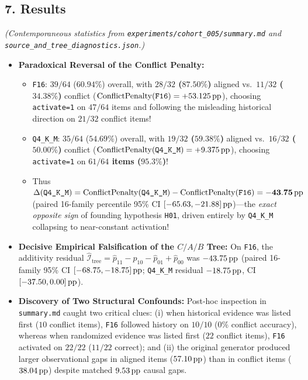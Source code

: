 \subsection*{7. Results}
\emph{(Contemporaneous statistics from \texttt{experiments/cohort\_005/summary.md} and \texttt{source\_and\_tree\_diagnostics.json}.)}
\begin{itemize}
  \item \textbf{Paradoxical Reversal of the Conflict Penalty:}
    \begin{itemize}
      \item \texttt{F16}: $39/64$ ($60.94\%$) overall, with \textbf{$28/32$ ($87.50\%$)} aligned vs.\ \textbf{$11/32$ ($34.38\%$)} conflict ($\mathrm{ConflictPenalty}(\text{\texttt{F16}}) = +53.125\,\mathrm{pp}$), choosing \texttt{activate=1} on $47/64$ items and following the misleading historical direction on $21/32$ conflict items!
      \item \texttt{Q4\_K\_M}: $35/64$ ($54.69\%$) overall, with \textbf{$19/32$ ($59.38\%$)} aligned vs.\ \textbf{$16/32$ ($50.00\%$)} conflict ($\mathrm{ConflictPenalty}(\text{\texttt{Q4\_K\_M}}) = +9.375\,\mathrm{pp}$), choosing \texttt{activate=1} on \textbf{$61/64$ items ($95.3\%$)}!
      \item Thus $\Delta(\text{\texttt{Q4\_K\_M}}) = \mathrm{ConflictPenalty}(\text{\texttt{Q4\_K\_M}}) - \mathrm{ConflictPenalty}(\text{\texttt{F16}}) = \mathbf{-43.75\,\mathrm{pp}}$ (paired 16-family percentile 95\% CI $[-65.63, -21.88]\,\mathrm{pp}$)---the \emph{exact opposite sign} of founding hypothesis \texttt{H01}, driven entirely by \texttt{Q4\_K\_M} collapsing to near-constant activation!
    \end{itemize}
  \item \textbf{Decisive Empirical Falsification of the $C/A/B$ Tree:} On \texttt{F16}, the additivity residual $\widehat{\mathcal{I}}_{\mathrm{tree}} = \hat{p}_{11} - \hat{p}_{10} - \hat{p}_{01} + \hat{p}_{00}$ was \textbf{$-43.75\,\mathrm{pp}$} (paired 16-family 95\% CI $[-68.75, -18.75]\,\mathrm{pp}$; \texttt{Q4\_K\_M} residual $-18.75\,\mathrm{pp}$, CI $[-37.50, 0.00]\,\mathrm{pp}$).
  \item \textbf{Discovery of Two Structural Confounds:} Post-hoc inspection in \texttt{summary.md} caught two critical clues: (i) when historical evidence was listed first ($10$ conflict items), \texttt{F16} followed history on $10/10$ ($0\%$ conflict accuracy), whereas when randomized evidence was listed first ($22$ conflict items), \texttt{F16} activated on $22/22$ ($11/22$ correct); and (ii) the original generator produced larger observational gaps in aligned items ($57.10\,\mathrm{pp}$) than in conflict items ($38.04\,\mathrm{pp}$) despite matched $9.53\,\mathrm{pp}$ causal gaps.
\end{itemize}

